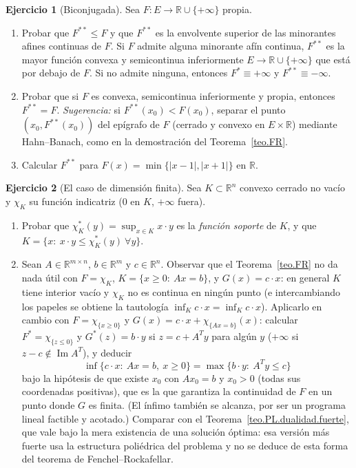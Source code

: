 \documentclass[12pt, a4paper]{amsbook}
\newcommand{\R}{{\mathbb R}}
\theoremstyle{remark}
\theoremstyle{definition}
\newtheorem{ejercicio}{Ejercicio}[chapter]
\numberwithin{section}{chapter}
\numberwithin{subsection}{section}
\numberwithin{equation}{section}
\numberwithin{figure}{chapter}
\begin{document}
\begin{ejercicio}[Biconjugada]\label{ejer.FR.biconjugada}
Sea $F\colon E\to\R\cup\{+\infty\}$ propia.
\begin{enumerate}[label=(\alph*)]
\item Probar que $F^{**}\le F$ y que $F^{**}$ es la envolvente superior de
las minorantes afines continuas de $F$. Si $F$ admite alguna minorante afín
continua, $F^{**}$ es la mayor función convexa y semicontinua inferiormente
$E\to\R\cup\{+\infty\}$ que está por debajo de $F$. Si no admite ninguna,
entonces $F^*\equiv+\infty$ y $F^{**}\equiv-\infty$.
\item Probar que si $F$ es convexa, semicontinua inferiormente y propia,
entonces $F^{**}=F$. \emph{Sugerencia:} si $F^{**}(x_0)<F(x_0)$, separar el
punto $(x_0,F^{**}(x_0))$ del epígrafo de $F$ (cerrado y convexo en
$E\times\R$) mediante Hahn--Banach, como en la demostración del
Teorema~\ref{teo.FR}.
\item Calcular $F^{**}$ para $F(x)=\min\{|x-1|,|x+1|\}$ en $\R$.
\end{enumerate}
\end{ejercicio}

\begin{ejercicio}[El caso de dimensión finita]\label{ejer.FR.dimension.finita}
Sea $K\subset\R^n$ convexo cerrado no vacío y $\chi_K$ su función indicatriz
($0$ en $K$, $+\infty$ fuera).
\begin{enumerate}[label=(\alph*)]
\item Probar que $\chi_K^*(y)=\sup_{x\in K}x\cdot y$ es la \emph{función
soporte} de $K$, y que $K=\{x:\ x\cdot y\le\chi_K^*(y)\ \forall y\}$.
\item Sean $A\in\R^{m\times n}$, $b\in\R^m$ y $c\in\R^n$. Observar que el
Teorema~\ref{teo.FR} no da nada útil con $F=\chi_K$,
$K=\{x\ge0:\ Ax=b\}$, y $G(x)=c\cdot x$: en general $K$ tiene interior vacío
y $\chi_K$ no es continua en ningún punto (e intercambiando los papeles se
obtiene la tautología $\inf_Kc\cdot x=\inf_Kc\cdot x$). Aplicarlo en cambio con
$F=\chi_{\{x\ge0\}}$ y $G(x)=c\cdot x+\chi_{\{Ax=b\}}(x)$: calcular
$F^*=\chi_{\{z\le0\}}$ y $G^*(z)=b\cdot y$ si $z=c+A^Ty$ para algún $y$
($+\infty$ si $z-c\notin\operatorname{Im}A^T$), y deducir
\[
\inf\{c\cdot x:\ Ax=b,\ x\ge0\}=\max\{b\cdot y:\ A^Ty\le c\}
\]
bajo la hipótesis de que existe $x_0$ con $Ax_0=b$ y $x_0>0$ (todas sus
coordenadas positivas), que es la que garantiza la continuidad de $F$ en
un punto donde $G$ es finita. (El ínfimo también se alcanza, por ser un
programa lineal factible y acotado.) Comparar con el
Teorema~\ref{teo.PL.dualidad.fuerte}, que vale bajo la mera existencia de una
solución óptima: esa versión más fuerte usa la estructura poliédrica del
problema y no se deduce de esta forma del teorema de Fenchel--Rockafellar.
\end{enumerate}
\end{ejercicio}
\end{document}

